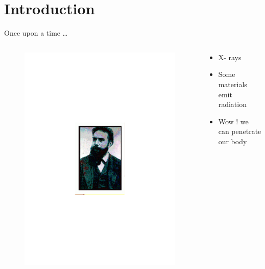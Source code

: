 \section{Introduction}


\begin{frame}{Once upon a time \ldots}

\begin{columns}[T]

    \begin{column}{.25\textwidth}
\begin{figure}
\includegraphics[scale=0.2]{figures/20160216_rsw_roentgen.pdf}
\end{figure}    
    
    \end{column}
    
    \begin{column}{.65\textwidth}
    \begin{itemize}
\item X- rays
\item Some materials emit radiation 
\item Wow ! we can penetrate our body
\end{itemize}
    \end{column}
    
    
\end{columns}




\end{frame}

